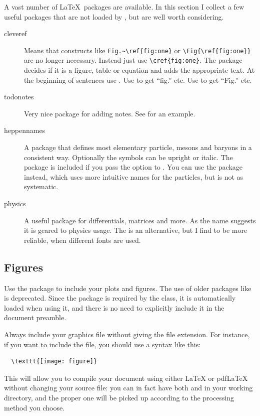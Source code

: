 A vast number of \LaTeX\ packages are available.
In this section I collect a few useful packages that are not loaded
by , but are well worth considering.

\begin{description}
  \item[cleveref] Means that constructs like \verb|Fig.~\ref{fig:one}| or
  \verb|\Fig{\ref{fig:one}}| are no longer necessary.
  Instead just use \verb|\cref{fig:one}|.
  The package decides if it is a figure, table or equation and
  adds the appropriate text.
  At the beginning of sentences use .
  Use  to get \enquote{fig.} etc.
  Use  to get \enquote{Fig.} etc.

  \item[todonotes] Very nice package for adding notes.
  See  for an example.

  \item[heppennames] A package that defines most elementary particle, mesons and baryons in a
  consistent way. Optionally the symbols can be upright or italic.
  The package is included if you pass the option  to .
  You can use the package  instead, which uses more intuitive names for the particles,
  but is not as systematic.

  \item[physics] A useful package for differentials, matrices and more.
  As the name suggests it is geared to physics usage.
  The  is an alternative, but I find  to be more reliable,
  when different fonts are used.
\end{description}


\subsection{Figures}

Use the  package to include your plots and figures. 
The use of older packages like  is deprecated.
Since the  package is required by the 
class, it is automatically loaded when using it, and there is no need
to explicitly include it in the document preamble.

Always include your graphics file without giving the file extension.
For instance, if you want to include the 
file, you should use a syntax like this:
\begin{verbatim}
  \texttt{[image: figure]}
\end{verbatim}
This will allow you to compile your document using either \LaTeX{} or
pdf\LaTeX{} without changing your source file: you can in fact have
both  and  in your working directory,
and the proper one will be picked up according to the processing method
you choose.

